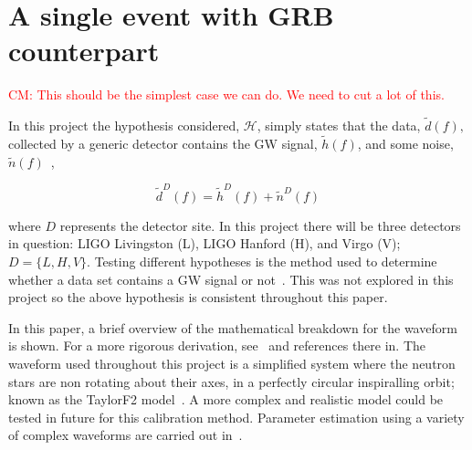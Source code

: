 \documentclass[12pt]{iopart}
\newcommand{\curlH}{\mathcal{H}}
\newcommand{\gws}{\tilde{h}}
\newcommand{\cm}[1]{\textcolor{red}{CM: #1}}
\begin{document}
\section{A single event with GRB counterpart\label{sec:single}}

\cm{This should be the simplest case we can do.  We need to cut a lot of this.}









In this project the hypothesis considered, $\curlH$, simply states that the
data, $\tilde{d}(f),$ collected by a generic detector contains the GW signal,
$\gws(f)$, and some noise, $\tilde{n}(f)$~\cite{JVei},

\begin{equation}
  \label{eq:data}
  \tilde{d}^D(f) = \gws^D(f) + \tilde{n}^D(f)
\end{equation}

where $D$ represents the detector site. In this project there will be three
detectors in question: LIGO Livingston (L), LIGO Hanford (H), and Virgo (V); $D
= \{L,H,V\}$. Testing different hypotheses is the method used to determine
whether a data set contains a GW signal or not~\cite{SathSchutz}. This was not
explored in this project so the above hypothesis is consistent throughout this
paper.

In this paper, a brief overview of the mathematical breakdown for the waveform
is shown. For a more rigorous derivation, see~\cite{SathSchutz} and references
there in. The waveform used throughout this project is a simplified system
where the neutron stars are non rotating about their axes, in a perfectly
circular inspiralling orbit; known as the TaylorF2 model~\cite{TF2,pN}. A more
complex and realistic model could be tested in future for this calibration
method. Parameter estimation using a variety of complex waveforms are carried
out in~\cite{peadvanced}.
\end{document}
